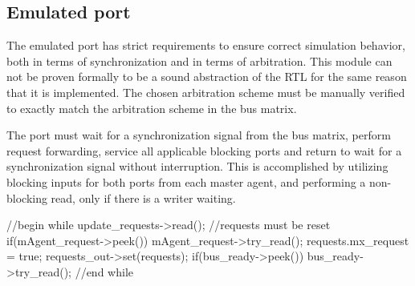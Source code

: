 \subsection{Emulated port}
\label{sub:portem}
The emulated port has strict requirements to ensure correct simulation behavior, both in terms of synchronization and in terms of arbitration. This module can not be proven formally to be a sound abstraction of the RTL for the same reason that it is implemented. The chosen arbitration scheme must be manually verified to exactly match the arbitration scheme in the bus matrix. \par
The port must wait for a synchronization signal from the bus matrix, perform request forwarding, service all applicable blocking ports and return to wait for a synchronization signal without interruption. This is accomplished by utilizing blocking inputs for both ports from each master agent, and performing a non-blocking read, only if there is a writer waiting. 

\begin{C++}
//begin while
update_requests->read(); 
//requests must be reset 
if(mAgent_request->peek()){
mAgent_request->try_read();
requests.mx_request = true;
}
requests_out->set(requests); 
if(bus_ready->peek()) bus_ready->try_read();
//end while
\end{C++}


